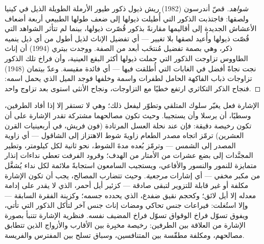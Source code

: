 \begin{proof}[شواهد]
قصّ أندرسون (1982) ريش ذيول ذكور طيور الأرملة الطويلة الذيل
في كينيا ولصقها: فاجتذبت الذكور التي أُطيلت ذيولها إلى ضعف
طولها الطبيعي أربعة أضعاف الأعشاش الجديدة إلى أقاليمها
مقارنةً بذكور قُصّرت ذيولها، بينما لم تتأثر الشواهد التي
قُصّت ذيولها وأُعيد لصقها بلا تغيير --- أي تفضيل الإناث لذيل
أطول من أي ذيل ينميه ذكر، وهي بصمة تفضيل مُنتخَب أبعد من
الصفة. ووجدت بيتري (1994) أن إناث الطاووس تزاوجت الذكور
التي حملت ذيولها أكثر البقع العينية، وأن فراخ تلك الذكور
نجت نجاةً أفضل في الغابات التي أُطلقت فيها --- أي فائدة
 مقيسة. وعدّ بيتمان (1948) تزاوجات ذباب الفاكهة
الحامل لطفرات واسمة وخلفها فوجد الميل الذي يحمل اسمه:
فنجاح الذكر التكاثري ارتفع خطيًا مع التزاوجات، ونجاح الأنثى
استوى بعد تزاوج واحد.
\end{proof}

\begin{proposition}\label{prop:b3:behavioural-ecology:signals}
الإشارة فعل يغيّر سلوك المتلقي وتطوّر ليفعل ذلك؛ وهي لا
تستقر إلا إذا أفاد الطرفين، وسطيًا، أن يرسلا وأن يستجيبا.
وحيث تكون مصالحهما مشتركة تقدر الإشارة على أن تكون رخيصة
دقيقة: فإن \emph{} عند نحلة العسل المرتادة (فون
فريش، في أربعينيات القرن العشرين) ترمّز اتجاه مصدر الطعام
زاويةَ شوط الاهتزاز إلى الشاقول --- أي زاوية المصدر إلى الشمس
--- وترمّز بُعده مدةَ الشوط، نحو ثانية لكل
كيلومتر، وتطير المجنَّدات إلى بضع عشرات من الأمتار من
الهدف؛ وقرود الفرفت تعطي نداءات إنذار متمايزة للنمور
والنسور والأفاعي، ويستجيب السامعون استجابةً ملائمة لكل نداء
يُشغَّل من مكبر مخفي --- أي إشارات \emph{مرجعية}. وحيث تتضارب
المصالح، يجب أن تكون الإشارة مكلفة أو غير قابلة للتزوير لتبقى
صادقة --- كزئير أيل أحمر، الذي لا يقدر على إدامة معدله إلا
أيل لائق؛ وكحجم نقيق ضفدع، الذي يحدده جسمه؛ وكزينة الفقرة
السابقة --- وإلا استُغلت: فيراعات جنس تحاكي
ومضات إناث جنس آخر لتأكل الذكور التي تأتي، ويفوق تسوّل فراخ
الوقواق تسوّل فراخ المضيف نفسه. فنظرية الإشارة تتنبأ
بصورة الإشارة من العلاقة بين الطرفين: رخيصة
مخبِرة بين الأقارب والأزواج الذين تتطابق مصالحهم، ومكلفة
مطقّسة بين المتنافسين، وسباق تسلح بين المفترس والفريسة.
\end{proposition}
\admitted


